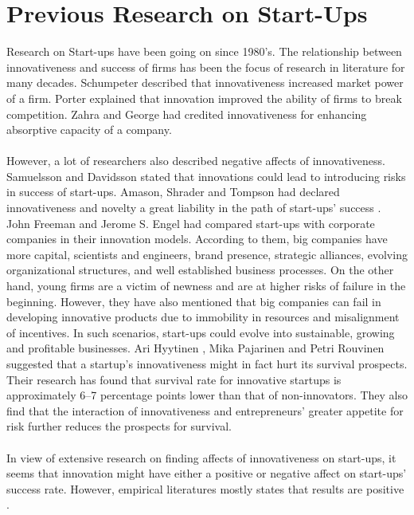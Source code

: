 \section{Previous Research on Start-Ups\label{sec:previous_r_startups}}
Research on Start-ups have been going on since 1980’s. The
relationship between innovativeness and success of firms has been the focus of research in literature
for many decades. Schumpeter \cite{16} described that innovativeness increased market power of a firm.
Porter \cite{17} explained that innovation improved the ability of firms to break competition. Zahra
and George \cite{18} had credited innovativeness for enhancing absorptive capacity of a company.
\\
\\
However, a lot of researchers also described negative affects of innovativeness. Samuelsson and
Davidsson \cite{19} stated that innovations could lead to introducing risks in success of start-ups.
Amason, Shrader and Tompson \cite{20} had declared innovativeness and novelty a great liability in the
path of start-ups’ success . John Freeman and Jerome S. Engel \cite{15} had compared start-ups with
corporate companies in their innovation models. According to them, big companies have
more capital, scientists and engineers, brand presence, strategic alliances, evolving organizational
structures, and well established business processes. On the other hand, young firms are a victim of
newness and are at higher risks of failure in the beginning. However, they have also mentioned that
big companies can fail in developing innovative products due to immobility in resources and
misalignment of incentives. In such scenarios, start-ups could evolve into sustainable, growing and
profitable businesses. Ari Hyytinen , Mika Pajarinen and Petri Rouvinen \cite{21} suggested that a
startup's innovativeness might in fact hurt its survival prospects. Their research has found that
survival rate for innovative startups is approximately 6–7 percentage points lower than that of non-innovators. They also find that the interaction of innovativeness and entrepreneurs' greater appetite
for risk further reduces the prospects for survival.
\\
\\
In view of extensive research on finding affects of innovativeness on start-ups, it seems
that innovation might have either a positive or negative affect on start-ups’ success rate.
However, empirical literatures mostly states that results are positive \cite{21}.
